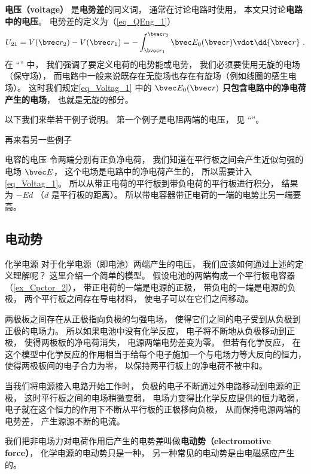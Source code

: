 

\textbf{电压（voltage）} 是\textbf{电势差}的同义词， 通常在讨论电路时使用， 本文只讨论\textbf{电路中的电压}。 电势差的定义为（\autoref{eq_QEng_1}）
\begin{equation}\label{eq_Voltag_1}
U_{21} = V(\bvec r_2) - V(\bvec r_1) = - \int_{\bvec r_1}^{\bvec r_2} \bvec E_0(\bvec r) \vdot \dd{\bvec r}~.
\end{equation}
在 “” 中， 我们强调了要定义电荷的电势能或电势， 我们必须要使用无旋的电场（保守场）， 而电路中一般来说既存在无旋场也存在有旋场（例如线圈的感生电场）。 这时我们规定\autoref{eq_Voltag_1} 中的 $\bvec E_0(\bvec r)$ \textbf{只包含电路中的净电荷产生的电场}， 也就是无旋的部分。

以下我们来举若干例子说明。 第一个例子是电阻两端的电压， 见 “”。

再来看另一些例子
\begin{example}{电容的电压}
令两端分别有正负净电荷， 我们知道在平行板之间会产生近似匀强的电场 $\bvec E$， 这个电场是电路中的净电荷产生的， 所以需要计入\autoref{eq_Voltag_1}。 所以从带正电荷的平行板到带负电荷的平行板进行积分， 结果为 $-E d$ （$d$ 是平行板的距离）。 所以带电容器带正电荷的一端的电势比另一端要高。
\end{example}

\subsection{电动势}
\begin{example}{化学电源}
对于化学电源（即电池）两端产生的电压， 我们应该如何通过上述的定义理解呢？ 这里介绍一个简单的模型。 假设电池的两端构成一个平行板电容器（\autoref{ex_Cpctor_2}）， 带正电荷的一端是电源的正极， 带负电的一端是电源的负极， 两个平行板之间存在导电材料， 使电子可以在它们之间移动。

两极板之间存在从正极指向负极的匀强电场， 使得它们之间的电子受到从负极到正极的电场力。 所以如果电池中没有化学反应， 电子将不断地从负极移动到正极， 使得两极板的净电荷消失， 电源两端电势差变为零。 但若有化学反应， 在这个模型中化学反应的作用相当于给每个电子施加一个与电场力等大反向的恒力， 使得两极板间的电子合力为零， 以保持两平行板上的净电荷不被中和。

当我们将电源接入电路开始工作时， 负极的电子不断通过外电路移动到电源的正极， 这时平行板之间的电场稍微变弱， 电场力变得比化学反应提供的恒力略弱， 电子就在这个恒力的作用下不断从平行板的正极移向负极， 从而保持电源两端的电势差， 产生源源不断的电流。
\end{example}
我们把非电场力对电荷作用后产生的电势差叫做\textbf{电动势（electromotive force）}， 化学电源的电动势只是一种， 另一种常见的电动势是由电磁感应产生的。

